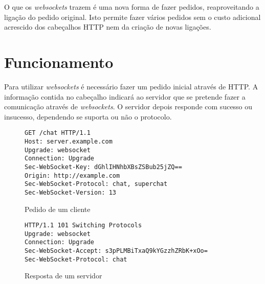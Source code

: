 \documentclass[a4paper]{article}
\begin{document}
O que os \emph{websockets} trazem é uma nova forma de fazer pedidos, reaproveitando a ligação do pedido original. Isto permite fazer vários pedidos sem o custo adicional acrescido dos cabeçalhos HTTP nem da criação de novas ligações.

\section{Funcionamento}

Para utilizar \emph{websockets} é necessário fazer um pedido inicial através de HTTP. A informação contida no cabeçalho indicará ao servidor que se pretende fazer a comunicação através de \emph{websockets}. O servidor depois responde com sucesso ou insucesso, dependendo se suporta ou não o protocolo.

\begin{figure}
	\begin{framed}
		\texttt{\small GET /chat HTTP/1.1 \\
						Host: server.example.com \\
						Upgrade: websocket\\
						Connection: Upgrade\\
						Sec-WebSocket-Key: dGhlIHNhbXBsZSBub25jZQ==\\
						Origin: http://example.com\\
						Sec-WebSocket-Protocol: chat, superchat\\
						Sec-WebSocket-Version: 13\\
		}		
	\end{framed}
	\caption{Pedido de um cliente}
  \label{fig:httpHeaderReq}
\end{figure}

\begin{figure}
	\begin{framed}
		\texttt{\small HTTP/1.1 101 Switching Protocols\\
					Upgrade: websocket\\
					Connection: Upgrade\\
					Sec-WebSocket-Accept: s3pPLMBiTxaQ9kYGzzhZRbK+xOo=\\
					Sec-WebSocket-Protocol: chat\\
		}
	\end{framed}
		\caption{Resposta de um servidor}
  \label{fig:httpHeaderRspS}
\end{figure}
\end{document}
